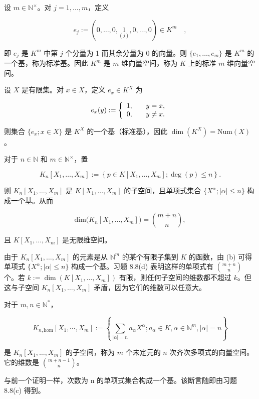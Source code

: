 \begin{example}

\begin{items}
\item

设  $ m \in \mathbb{N}^\times $。对  $ j = 1, \ldots, m $，定义

\[
e_{j}:=\left(0,\ldots,0,\underset{(j)}{1},0,\ldots,0\right)\in K^{m}\quad,
\]

即  $ e_j $ 是  $ K^m $ 中第  $ j $ 个分量为 1 而其余分量为 0 的向量。则  $ \{e_1, \ldots, e_m\} $ 是  $ K^m $ 的一个基，称为标准基。因此  $ K^m $ 是  $ m $ 维向量空间，称为  $ K $ 上的标准  $ m $ 维向量空间。

\item

设 $X$ 是有限集。对 $x \in X$，定义 $e_x \in K^X$ 为

\begin{equation}
e_{x}(y):=\left\{\begin{array}{l l}{1,}&{\quad y=x,}\\ {0,}&{\quad y\neq x.}\end{array}\right.
\end{equation}

则集合 $\{e_x; x \in X\}$ 是 $K^X$ 的一个基（标准基），因此 $\dim(K^X) = \text{Num}(X)$。

\item

对于  $ n \in \mathbb{N} $ 和  $ m \in \mathbb{N}^\times $，置

\[
K_{n}[X_{1},\ldots,X_{m}]:=\left\{p\in K[X_{1},\ldots,X_{m}];\operatorname{d e g}(p)\leq n\right\}.
\]

则  $ K_n[X_1, \ldots, X_m] $ 是  $ K[X_1, \ldots, X_m] $ 的子空间，且单项式集合  $ \{X^\alpha; |\alpha| \leq n\} $ 构成一个基。从而

\[
\mathrm{dim}\big(K_{n}[X_{1},\ldots,X_{m}]\big)=\binom{m+n}{n},
\]

且 $K[X_{1},\ldots,X_{m}]$ 是无限维空间。

\proofhead
由于  $ K_n[X_1, \ldots, X_m] $ 的元素是从  $ \mathbb{N}^m $ 的某个有限子集到  $ K $ 的函数，由 (b) 可得单项式  $ \{X^\alpha; |\alpha| \leq n\} $ 构成一个基。习题 8.8(d) 表明这样的单项式有  $ \binom{m+n}{n} $ 个。若  $ k := \dim(K[X_1, \ldots, X_m]) $ 有限，则任何子空间的维数都不超过  $ k $。但这与子空间  $ K_n[X_1, \ldots, X_m] $ 矛盾，因为它们的维数可以任意大。
\item

对于  $ m, n \in \mathbb{N}^* $，

\[
K_{n,\mathrm{hom}}[X_{1},\cdots,X_{m}]:=\left\{\sum_{|\alpha|=n}a_{\alpha}X^{\alpha};a_{\alpha}\in K,\alpha\in\mathbb{N}^{m},|\alpha|=n\right\}
\]

是  $ K_n[X_1, \ldots, X_m] $ 的子空间，称为  $ m $ 个未定元的  $ n $ 次齐次多项式的向量空间。它的维数是  $ \binom{m+n-1}{n} $。

\proofhead
与前一个证明一样，次数为 n 的单项式集合构成一个基。该断言随即由习题 8.8(c) 得到。
\end{items}

\end{example}

